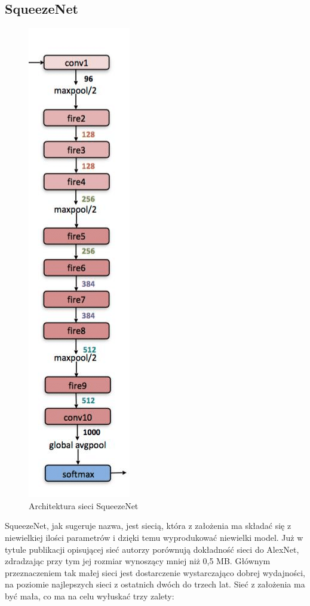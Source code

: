 \documentclass[12pt,a4paper,twoside,titlepage,openright]{book}
\begin{document}
\begin{itemize}
\begin{itemize}
\section{SqueezeNet}
\begin{figure}[ht]
	\centering
			\includegraphics[resolution=100, scale=0.65]{SqueezeNet.png}
		\caption{Architektura sieci SqueezeNet}
\end{figure}
SqueezeNet, jak sugeruje nazwa, jest siecią, która z założenia ma składać się z niewielkiej ilości parametrów i dzięki temu wyprodukować niewielki model. Już w tytule publikacji opisującej sieć autorzy porównują dokładność sieci do AlexNet, zdradzając przy tym jej rozmiar wynoszący mniej niż 0,5 MB. Głównym przeznaczeniem tak małej sieci jest dostarczenie wystarczająco dobrej wydajności, na poziomie najlepszych sieci z ostatnich dwóch do trzech lat. Sieć z założenia ma być mała, co ma na celu wyłuskać trzy zalety:

\end{itemize}
\end{itemize}
\end{document}
